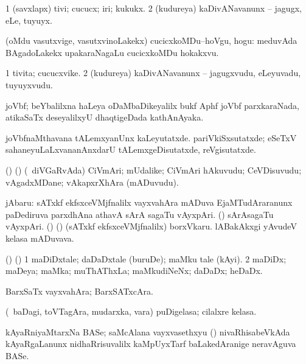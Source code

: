 \noindent
\gl{\sakirx}
\bmng
\bnum
\num{1} (savxlapx) tivi; cucucx; iri; kukukx. 
\num{2} (kudureya) kaDivANavanunx -- jagugx, eLe, tuyuyx. 
\enum
\emng

\noindent
\gl{\akirx}
\bmng
(oMdu vasutxvige, vasutxvinoLakekx) cucicxkoMDu--hoVgu, hogu:  meduvAda BAgadoLakekx upakaraNagaLu cucicxkoMDu hokakxvu. 
\emng
\eentry

\bentry
{}
\gl{\nA}
\bmng
\bnum
\num{1} tivita; cucucxvike. 
\num{2} (kudureya) kaDivANavanunx -- jagugxvudu, eLeyuvadu, tuyuyxvudu. 
\enum
\emng
\eentry

\bentry
{}
\gl{\nA}
\bmng
joVbf; beYbalilxna haLeya oDaMbaDikeyalilx bukf Aphf joVbf parxkaraNada, atikaSaTx deseyalilxyU dhaqtigeDada kathAnAyaka. 
\emng

\noindent
\gl{\nuga}
\bmng
{} joVbfnaMthavana tALemxyanUnx kaLeyutatxde. pariVkiSxsutatxde; eSeTxV sahaneyuLaLxvananAnxdarU tALemxgeDisutatxde, reVgisutatxde. 
\emng
\eentry

\bentry
{}
\gl{\nA}
\bmng
(\birx) (\AmA) (\kanmu\ diVGaRvAda) CiVmAri; mUdalike; CiVmAri hAkuvudu; CeVDisuvudu; vAgadxMDane; vAkapxrXhAra (mADuvudu). 
\emng
\eentry

\bentry
{}
\gl{\nA}
\bmng
jAbaru: 
\banum
{} sATxkf ekfsxceVMjfnalilx vayxvahAra mADuva EjaMTudAraranunx paDediruva parxdhAna athavA sArA sagaTu vAyxpAri. 
 (\ame) sArAsagaTu vAyxpAri. 
 (\hiV) (\ame) (sATxkf ekfsxceVMjfnalilx) borxVkaru. 
 lABakAkxgi yAvudeV kelasa mADuvava. 
\eanum
\emng
\eentry

\bentry
{}
\gl{\nA}
\bmng
(\birx) (\AmA) 
\bnum
\num{1} maDiDxtale; daDaDxtale (buruDe); maMku tale (kAyi). 
\num{2} maDiDx; maDeya; maMka; muThAThxLa; maMkudiNeNx; daDaDx; heDaDx. 
\enum
\emng
\eentry

\bentry
{}
\gl{\nA}
\bmng
BarxSaTx vayxvahAra; BarxSATxcAra. 
\emng
\eentry

\bentry
{}
\gl{\nA}
\bmng
(\kanmu\ baDagi, toVTagAra, mudarxka, \mo vara) puDigelasa; cilalxre kelasa. 
\emng
\eentry

\bentry
{}
\gl{\nA}
\bmng
kAyaRniyaMtarxNa BASe; saMcAlana vayxvasethxyu () nivaRhisabeVkAda kAyaRgaLanunx nidhaRrisuvalilx kaMpUyxTarf baLakedAranige neravAguva BASe. 
\emng
\eentry

